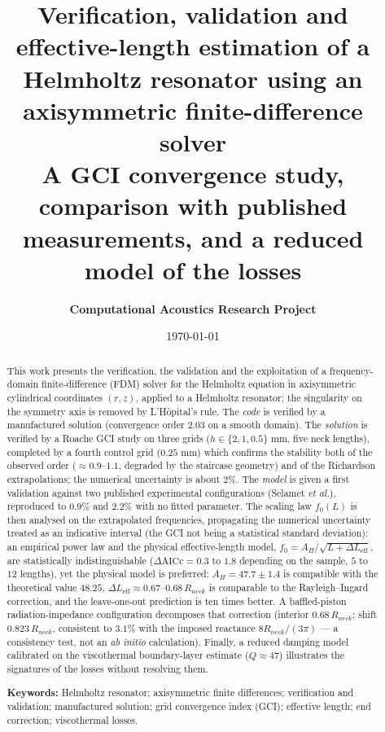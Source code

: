 \documentclass[11pt,a4paper,twocolumn]{article}
\title{\textbf{Verification, validation and effective-length estimation of a Helmholtz resonator using an axisymmetric finite-difference solver} \\ \large A GCI convergence study, comparison with published measurements, and a reduced model of the losses}
\author{\textbf{Computational Acoustics Research Project}}
\date{\today}
\begin{document}
\maketitle

\begin{abstract}
This work presents the verification, the validation and the exploitation of a frequency-domain finite-difference (FDM) solver for the Helmholtz equation in axisymmetric cylindrical coordinates $(r,z)$, applied to a Helmholtz resonator; the singularity on the symmetry axis is removed by L'H\^opital's rule. The \emph{code} is verified by a manufactured solution (convergence order $2.03$ on a smooth domain). The \emph{solution} is verified by a Roache GCI study on three grids ($h \in \{2, 1, 0.5\}\text{ mm}$, five neck lengths), completed by a fourth control grid ($0.25$ mm) which confirms the stability both of the observed order ($\approx 0.9$--$1.1$, degraded by the staircase geometry) and of the Richardson extrapolations; the numerical uncertainty is about $2\%$. The \emph{model} is given a first validation against two published experimental configurations (Selamet \emph{et al.}), reproduced to $0.9\%$ and $2.2\%$ with no fitted parameter. The scaling law $f_0(L)$ is then analysed on the extrapolated frequencies, propagating the numerical uncertainty treated as an indicative interval (the GCI not being a statistical standard deviation): an empirical power law and the physical effective-length model, $f_0 = A_H/\sqrt{L + \Delta L_{\mathrm{eff}}}$, are statistically indistinguishable ($\Delta\text{AICc} = 0.3$ to $1.8$ depending on the sample, $5$ to $12$ lengths), yet the physical model is preferred: $A_H = 47.7 \pm 1.4$ is compatible with the theoretical value $48.25$, $\Delta L_{\mathrm{eff}} \approx 0.67$--$0.68\,R_{neck}$ is comparable to the Rayleigh--Ingard correction, and the leave-one-out prediction is ten times better. A baffled-piston radiation-impedance configuration decomposes that correction (interior $0.68\,R_{neck}$; shift $0.823\,R_{neck}$, consistent to $3.1\%$ with the imposed reactance $8R_{neck}/(3\pi)$ --- a consistency test, not an \emph{ab initio} calculation). Finally, a reduced damping model calibrated on the viscothermal boundary-layer estimate ($Q\approx47$) illustrates the signatures of the losses without resolving them.

\vspace{0.5em}
\noindent\textbf{Keywords:} Helmholtz resonator; axisymmetric finite differences; verification and validation; manufactured solution; grid convergence index (GCI); effective length; end correction; viscothermal losses.
\end{abstract}
\end{document}
